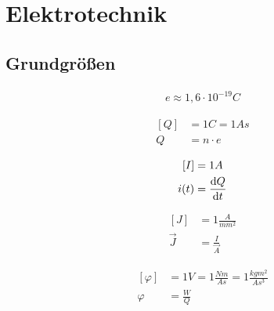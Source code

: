 \chapter{Elektrotechnik}
\section{Grundgrößen}

\begin{boxleft}
\end{boxleft}\begin{boxrightshaded}
\begin{align*}
e\approx 1,6\cdot 10^{-19}C
\end{align*}
\end{boxrightshaded}

\begin{boxleft}
\end{boxleft}\begin{boxrightshaded}
\begin{align*}
\left[Q\right]&=1C=1As\\
Q&=n\cdot e
\end{align*}
\end{boxrightshaded}

\begin{boxleft}
\end{boxleft}\begin{boxrightshaded}
\begin{align*}
\left[I\right]&=1A\\
i(t)&=\frac{\mathop{}\!\mathrm{d} Q}{\mathop{}\!\mathrm{d} t}
\end{align*}
\end{boxrightshaded}

\begin{boxleft}
\end{boxleft}\begin{boxrightshaded}
\begin{align*}
\left[J\right]&=1\frac{A}{mm^2}\\
\vec{J}&=\frac{I}{\vec{A}}
\end{align*}
\end{boxrightshaded}

\begin{boxleft}
\end{boxleft}\begin{boxrightshaded}
\begin{align*}
\left[\varphi\right]&=1V=1\frac{Nm}{As}=1\frac{kgm^2}{As^3}\\
\varphi&=\frac{W}{Q}
\end{align*}
\end{boxrightshaded}

